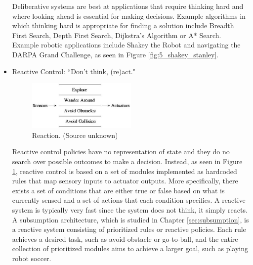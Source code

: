 \begin{itemize}
Deliberative systems are best at applications that require thinking hard and where looking ahead is essential for making decisions. Example algorithms in which thinking hard is appropriate for finding a solution include Breadth First Search, Depth First Search, Dijkstra's Algorithm or A* Search. Example robotic applications include Shakey the Robot and navigating the DARPA Grand Challenge, as seen in Figure \ref{fig:5_shakey_stanley}.


\item Reactive Control: ``Don't think, (re)act."

\begin{figure}[!h]
\centering
\includegraphics[width=0.5\textwidth]{figures/5_reaction.jpg}
\caption{Reaction. (Source unknown)}
\label{fig:5_reaction}
\end{figure}

Reactive control policies have no representation of state and they do no search over possible outcomes to make a decision. Instead, as seen in Figure \ref{fig:5_reaction}, reactive control is based on a set of modules implemented as hardcoded rules that map sensory inputs to actuator outputs. More specifically, there exists a set of conditions that are either true or false based on what is currently sensed and a set of actions that each condition specifies. A reactive system is typically very fast since the system does not think, it simply reacts. A subsumption architecture, which is studied in Chapter \ref{sec:subsumption}, is a reactive system consisting of prioritized rules or reactive policies. Each rule achieves a desired task, such as avoid-obstacle or go-to-ball, and the entire collection of prioritized modules aims to achieve a larger goal, such as playing robot soccer.


\end{itemize}
